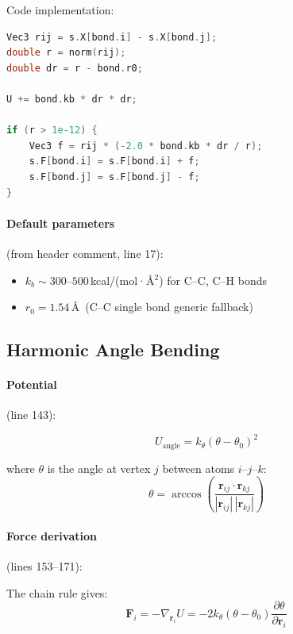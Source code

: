 \documentclass[11pt]{article}
\begin{document}
Code implementation:

\begin{lstlisting}[language=C++]
Vec3 rij = s.X[bond.i] - s.X[bond.j];
double r = norm(rij);
double dr = r - bond.r0;

U += bond.kb * dr * dr;

if (r > 1e-12) {
    Vec3 f = rij * (-2.0 * bond.kb * dr / r);
    s.F[bond.i] = s.F[bond.i] + f;
    s.F[bond.j] = s.F[bond.j] - f;
}
\end{lstlisting}

\paragraph{Default parameters} (from header comment, line 17):
\begin{itemize}
\item $k_b \sim 300$--$500$\,kcal/(mol·\AA$^2$) for C--C, C--H bonds
\item $r_0 = 1.54$\,\AA\ (C--C single bond generic fallback)
\end{itemize}

\subsection{Harmonic Angle Bending}

\paragraph{Potential} (line 143):

\begin{equation}
U_{\text{angle}} = k_\theta (\theta - \theta_0)^2
\end{equation}

where $\theta$ is the angle at vertex $j$ between atoms $i$--$j$--$k$:
\begin{equation}
\theta = \arccos\!\left(\frac{\mathbf{r}_{ij} \cdot \mathbf{r}_{kj}}{|\mathbf{r}_{ij}| \, |\mathbf{r}_{kj}|}\right)
\end{equation}

\paragraph{Force derivation} (lines 153--171):

The chain rule gives:
\begin{equation}
\mathbf{F}_i = -\nabla_{\mathbf{r}_i} U = -2k_\theta(\theta - \theta_0) \frac{\partial\theta}{\partial\mathbf{r}_i}
\end{equation}
\end{document}
